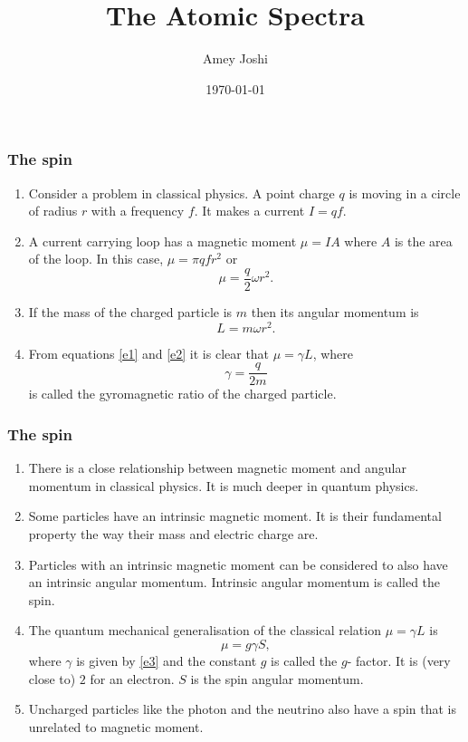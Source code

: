 \documentclass{beamer}
\title{The Atomic Spectra}
\author{Amey Joshi}
\date{\today}
\begin{document}
\begin{frame}
\titlepage
\end{frame}

\begin{frame}
\frametitle{The spin}
\begin{enumerate}
\item Consider a problem in classical physics. A point charge $q$ is moving in a
circle of radius $r$ with a frequency $f$. It makes a current $I = qf$.
\item A current carrying loop has a magnetic moment $\mu = IA$ where $A$ is the
area of the loop. In this case, $\mu = \pi qfr^2$ or
\begin{equation}\label{e1}
\mu = \frac{q}{2}\omega r^2.
\end{equation}
\item If the mass of the charged particle is $m$ then its angular momentum is
\begin{equation}\label{e2}
L = m\omega r^2.
\end{equation}
\item From equations \eqref{e1} and \eqref{e2} it is clear that $\mu=\gamma L$,
where
\begin{equation}\label{e3}
\gamma = \frac{q}{2m}
\end{equation}
is called the gyromagnetic ratio of the charged particle.
\end{enumerate}
\end{frame}

\begin{frame}
\frametitle{The spin}
\begin{enumerate}
\item There is a close relationship between magnetic moment and angular momentum
in classical physics. It is much deeper in quantum physics.
\item Some particles have an intrinsic magnetic moment. It is their fundamental
property the way their mass and electric charge are.
\item Particles with an intrinsic magnetic moment can be considered to also have
an intrinsic angular momentum. Intrinsic angular momentum is called the spin.
\item The quantum mechanical generalisation of the classical relation $\mu = 
\gamma L$ is
\begin{equation}\label{e1}
\mu = g\gamma S,
\end{equation}
where $\gamma$ is given by \eqref{e3} and the constant $g$ is called the $g$-
factor. It is (very close to) $2$ for an electron. $S$ is the spin angular 
momentum.
\item Uncharged particles like the photon and the neutrino also have a spin that 
is unrelated to magnetic moment.
\end{enumerate}
\end{frame}
\end{document}
